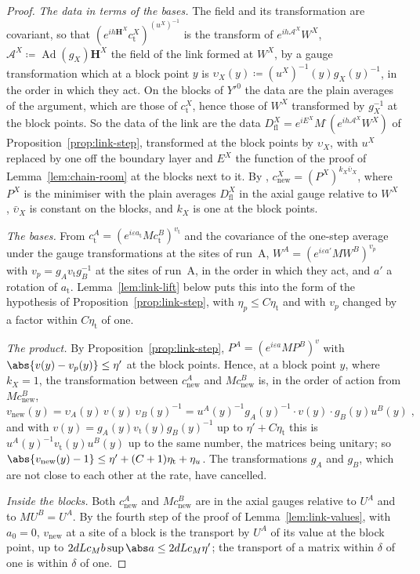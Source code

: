 \begin{proof}
\emph{The data in terms of the bases.} The field and its transformation are covariant, so that $(e^{ih\mathbf H^X}c^X_{\mathrm t})^{(u^X)^{-1}}$ is the transform of $e^{ih\mathcal A^X}W^X$, $\mathcal A^X \coloneqq \operatorname{Ad}(g_X)\mathbf H^X$ the field of the link formed at $W^X$, by a gauge transformation which at a block point $y$ is $\upsilon_X(y) \coloneqq (u^X)^{-1}(y)g_X(y)^{-1}$, in the order in which they act. On the blocks of $Y'^0$ the data are the plain averages of the argument, which are those of $c^X_{\mathrm t}$, hence those of $W^X$ transformed by $g_X^{-1}$ at the block points. So the data of the link are the data $D^X_{\mathrm{fl}} = e^{iE^X}M^\cdot(e^{ih\mathcal A^X}W^X)$ of Proposition~\ref{prop:link-step}, transformed at the block points by $\upsilon_X$, with $u^X$ replaced by one off the boundary layer and $E^X$ the function of the proof of Lemma~\ref{lem:chain-room} at the blocks next to it. By \cite[(181)]{BalabanVAR}, $c^X_{\mathrm{new}} = (P^X)^{k_X\bar\upsilon_X}$, where $P^X$ is the minimiser with the plain averages $D^X_{\mathrm{fl}}$ in the axial gauge relative to $W^X$, $\bar\upsilon_X$ is constant on the blocks, and $k_X$ is one at the block points.

\emph{The bases.} From $c^A_{\mathrm t} = (e^{i\varepsilon a_{\mathrm t}}Mc^B_{\mathrm t})^{v_{\mathrm t}}$ and the covariance of the one-step average under the gauge transformations at the sites of run~A, $W^A = (e^{i\varepsilon a'}MW^B)^{v_p}$ with $v_p = g_Av_{\mathrm t}g_B^{-1}$ at the sites of run~A, in the order in which they act, and $a'$ a rotation of $a_{\mathrm t}$. Lemma~\ref{lem:link-lift} below puts this into the form of the hypothesis of Proposition~\ref{prop:link-step}, with $\eta_p \leq C\eta_{\mathrm t}$ and with $v_p$ changed by a factor within $C\eta_{\mathrm t}$ of one.

\emph{The product.} By Proposition~\ref{prop:link-step}, $P^A = (e^{i\varepsilon a}MP^B)^v$ with $\abs{v(y) - v_p(y)} \leq \eta'$ at the block points. Hence, at a block point $y$, where $k_X = 1$, the transformation between $c^A_{\mathrm{new}}$ and $Mc^B_{\mathrm{new}}$ is, in the order of action from $Mc^B_{\mathrm{new}}$,
\[
    v_{\mathrm{new}}(y) = \upsilon_A(y)\,v(y)\,\upsilon_B(y)^{-1} = u^A(y)^{-1}g_A(y)^{-1}\cdot v(y)\cdot g_B(y)u^B(y)\;,
\]
and with $v(y) = g_A(y)v_{\mathrm t}(y)g_B(y)^{-1}$ up to $\eta' + C\eta_{\mathrm t}$ this is $u^A(y)^{-1}v_{\mathrm t}(y)u^B(y)$ up to the same number, the matrices being unitary; so $\abs{v_{\mathrm{new}}(y) - 1} \leq \eta' + (C + 1)\eta_{\mathrm t} + \eta_u$. The transformations $g_A$ and $g_B$, which are not close to each other at the rate, have cancelled.

\emph{Inside the blocks.} Both $c^A_{\mathrm{new}}$ and $Mc^B_{\mathrm{new}}$ are in the axial gauges relative to $U^A$ and to $MU^B = U^A$. By the fourth step of the proof of Lemma~\ref{lem:link-values}, with $a_0 = 0$, $v_{\mathrm{new}}$ at a site of a block is the transport by $U^A$ of its value at the block point, up to $2dLc_Mb\sup\abs a \leq 2dLc_M\eta'$; the transport of a matrix within $\delta$ of one is within $\delta$ of one.
\end{proof}

